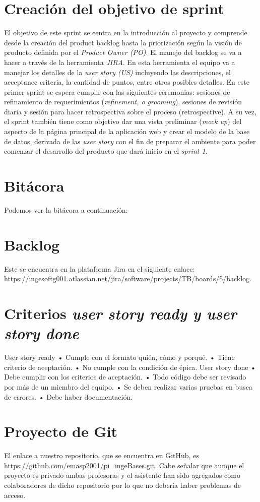 \documentclass{article}
\begin{document}
\section{Creación del objetivo de sprint}
El objetivo de este sprint se centra en la introducción al proyecto y
comprende desde la creación del product backlog hasta la priorización
según la visión de producto definida por el \textit{Product Owner (PO)}.
El manejo del backlog se va a hacer a través de la herramienta \textit{JIRA}.
En esta herramienta el equipo va a manejar los detalles de la
\textit{user story (US)} incluyendo las descripciones, el acceptance
criteria, la cantidad de puntos, entre otros posibles detalles. En este
primer sprint se espera cumplir con las siguientes ceremonias: sesiones
de refinamiento de requerimientos (\textit{refinement, o grooming}),
sesiones de revisión diaria y sesión para hacer retrospectiva sobre el
proceso (retrospective). A su vez, el sprint también tiene como objetivo
dar una vista preliminar (\textit{mock up}) del aspecto de la página principal de
la aplicación web y crear el modelo de la base de datos, derivada de las
\textit{user story} con el fin de preparar el ambiente para poder comenzar
el desarrollo del producto que dará inicio en el \textit{sprint 1}. 

\section{Bitácora}
Podemos ver la bitácora a continuación:

\section{Backlog}
Este se encuentra en la plataforma Jira en el siguiente enlace:
\url{https://ingesoftg001.atlassian.net/jira/software/projects/TB/boards/5/backlog}.

\section{Criterios \textit{user story ready y user story done}}
User story ready
    • Cumple con el formato quién, cómo y porqué.
    • Tiene criterio de aceptación.
    • No cumple con la condición de épica.
User story done
    • Debe cumplir con los criterios de aceptación.
    • Todo código debe ser revisado por más de un miembro del equipo.
    • Se deben realizar varias pruebas en busca de errores.
    • Debe haber documentación.

\section{Proyecto de Git}
El enlace a nuestro repositorio, que se encuentra en GitHub, es
\url{https://github.com/emasp2001/pi_ingeBases.git}. Cabe señalar que
aunque el proyecto es privado ambas profesoras y el asistente han sido
agregados como colaboradores de dicho repositorio por lo que no debería
haber problemas de acceso.
\end{document}
